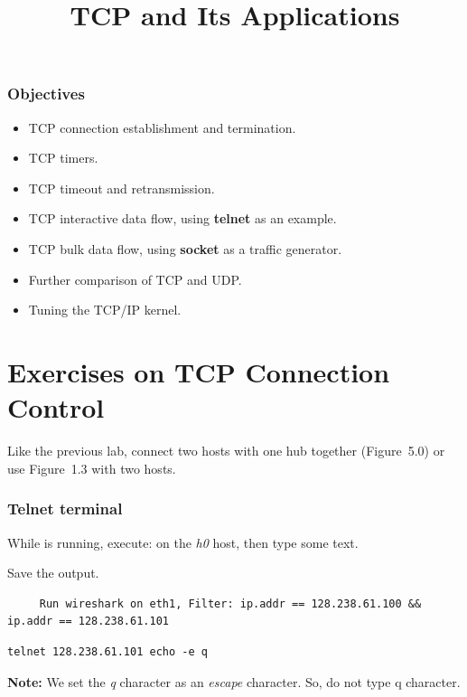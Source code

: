 \documentclass{UTNetLab}
\title{TCP and Its Applications}
\begin{document}
	\section*{Objectives}
	\begin{itemize}
		\item TCP connection establishment and termination.
		\item TCP timers.
		\item TCP timeout and retransmission.
		\item TCP interactive data flow, using \textbf{telnet} as an example.
		\item TCP bulk data flow, using \textbf{socket} as a traffic generator.
		\item Further comparison of TCP and UDP.
		\item Tuning the TCP/IP kernel.
	\end{itemize}
	
	
\part{Exercises on TCP Connection Control}
    Like the previous lab, connect two hosts with one hub together (Figure~5.0) or use Figure~1.3 with two hosts.
    
\section{Telnet terminal}
   While  is running, execute:  on the \textit{h0} host, then type some text.
   
   Save the  output.
		
     \begin{lstlisting}
     Run wireshark on eth1, Filter: ip.addr == 128.238.61.100 && ip.addr == 128.238.61.101

     \end{lstlisting}  
    
	\begin{lstlisting}[emph={remote-host}]
	telnet 128.238.61.101 echo -e q
	\end{lstlisting}

	\textbf{Note:} We set the \textit{q} character as an \textit{escape} character. So, do not type q character. 
	
\end{document}
